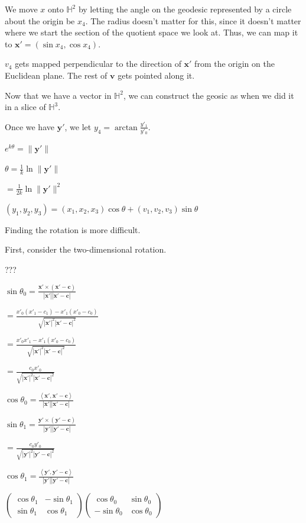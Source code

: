 \documentclass[12pt]{amsart}
\newcommand{\mat}[4]{\left(\begin{array}{ccc} #1 & #2 \\#3 & #4 \end{array} \right)}
\begin{document}
We move $x$ onto $\mathbb{H}^2$ by letting the angle on the geodesic represented by a circle about the origin be $x_4$. The radius doesn't matter for this, since it doesn't matter where we start the section of the quotient space we look at. Thus, we can map it to $\textbf{x}' = (\sin x_4,\cos x_4)$.

$v_4$ gets mapped perpendicular to the direction of $\textbf{x}'$ from the origin on the Euclidean plane. The rest of $\textbf{v}$ gets pointed along it.

Now that we have a vector in $\mathbb{H}^2$, we can construct the geosic as when we did it in a slice of $\mathbb{H}^3$.

Once we have $\textbf{y}'$, we let $y_4 = \arctan\frac{y'_1}{y'_0}$.

$e^{k\theta} = \|\textbf{y}'\|$

$\theta = \frac{1}{k}\ln\|\textbf{y}'\|$

$= \frac{1}{2k}\ln\|\textbf{y}'\|^2$

$(y_1,y_2,y_3) = (x_1,x_2,x_3)\cos\theta + (v_1,v_2,v_3)\sin\theta$

Finding the rotation is more difficult.

First, consider the two-dimensional rotation.

???


$\sin\theta_0 = \frac{\textbf{x}' \times (\textbf{x}'-\textbf{c})}{|\textbf{x}'||\textbf{x}'-\textbf{c}|}$

$= \frac{x'_0(x'_1-c_1) - x'_1(x'_0-c_0)}{\sqrt{|\textbf{x}'|^2|\textbf{x}'-\textbf{c}|^2}}$

$= \frac{x'_0 x'_1 - x'_1(x'_0-c_0)}{\sqrt{|\textbf{x}'|^2|\textbf{x}'-\textbf{c}|^2}}$

$= \frac{c_0 x'_0}{\sqrt{|\textbf{x}'|^2|\textbf{x}'-\textbf{c}|^2}}$

$\cos\theta_0 = \frac{\left<\textbf{x}',\textbf{x}'-\textbf{c}\right>}{|\textbf{x}'||\textbf{x}'-\textbf{c}|}$

$\sin\theta_1 = \frac{\textbf{y}' \times (\textbf{y}'-\textbf{c})}{|\textbf{y}'||\textbf{y}'-\textbf{c}|}$

$= \frac{c_0 y'_0}{\sqrt{|\textbf{y}'|^2|\textbf{y}'-\textbf{c}|^2}}$

$\cos\theta_1 = \frac{\left<\textbf{y}',\textbf{y}'-\textbf{c}\right>}{|\textbf{y}'||\textbf{y}'-\textbf{c}|}$

$\mat{\cos\theta_1}{-\sin\theta_1}{\sin\theta_1}{\cos\theta_1}\mat{\cos\theta_0}{\sin\theta_0}{-\sin\theta_0}{\cos\theta_0}$
\end{document}
